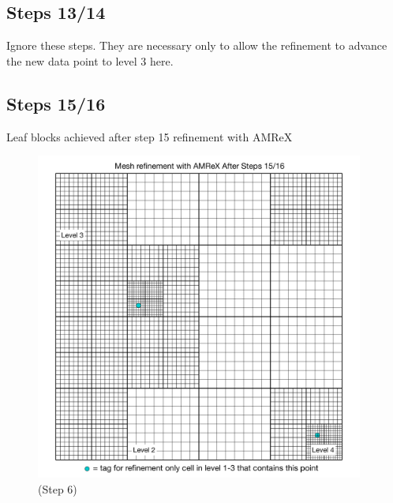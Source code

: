 \documentclass[12pt,letterpaper]{article}
\begin{document}
\newpage
\subsection{Steps 13/14}
Ignore these steps.  They are necessary only to allow the refinement to advance
the new data point to level 3 here.

\subsection{Steps 15/16}
Leaf blocks achieved after step 15 refinement with AMReX
\begin{figure}[!hp]
\begin{center}
\includegraphics[width=4.25in]{TestRefine_Step16_Both.pdf}
\caption{(Step 6) }
\end{center}
\end{figure}
\end{document}
